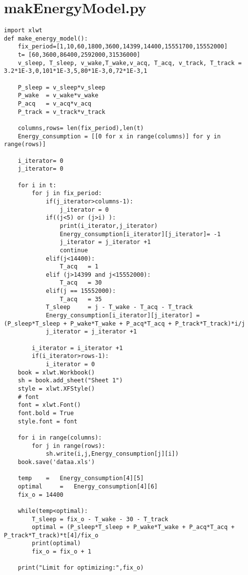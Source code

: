\begin{appendices}
\begin{lstlisting}
\end{lstlisting}
\label{Appendix:L76GNSS.py}
\chapter{makEnergyModel.py}
\begin{lstlisting}
import xlwt
def make_energy_model():
    fix_period=[1,10,60,1800,3600,14399,14400,15551700,15552000]
    t= [60,3600,86400,2592000,31536000]
    v_sleep, T_sleep, v_wake,T_wake,v_acq, T_acq, v_track, T_track = 3.2*1E-3,0,101*1E-3,5,80*1E-3,0,72*1E-3,1

    P_sleep = v_sleep*v_sleep
    P_wake  = v_wake*v_wake
    P_acq   = v_acq*v_acq
    P_track = v_track*v_track

    columns,rows= len(fix_period),len(t)
    Energy_consumption = [[0 for x in range(columns)] for y in range(rows)]

    i_iterator= 0
    j_iterator= 0

    for i in t:
        for j in fix_period:
            if(j_iterator>columns-1):
                j_iterator = 0   
            if((j<5) or (j>i) ):
                print(i_iterator,j_iterator)
                Energy_consumption[i_iterator][j_iterator]= -1
                j_iterator = j_iterator +1
                continue
            elif(j<14400):
                T_acq   = 1
            elif (j>14399 and j<15552000):
                T_acq   = 30      
            elif(j == 15552000):
                T_acq   = 35
            T_sleep     = j - T_wake - T_acq - T_track 
            Energy_consumption[i_iterator][j_iterator] = (P_sleep*T_sleep + P_wake*T_wake + P_acq*T_acq + P_track*T_track)*i/j
            j_iterator = j_iterator +1

        i_iterator = i_iterator +1
        if(i_iterator>rows-1):
            i_iterator = 0  
    book = xlwt.Workbook()
    sh = book.add_sheet("Sheet 1")
    style = xlwt.XFStyle()
    # font
    font = xlwt.Font()
    font.bold = True
    style.font = font
    
    for i in range(columns):
        for j in range(rows):
            sh.write(i,j,Energy_consumption[j][i])
    book.save('dataa.xls')

    temp    =   Energy_consumption[4][5]
    optimal     =   Energy_consumption[4][6]
    fix_o = 14400

    while(temp<optimal):  
        T_sleep = fix_o - T_wake - 30 - T_track
        optimal = (P_sleep*T_sleep + P_wake*T_wake + P_acq*T_acq + P_track*T_track)*t[4]/fix_o
        print(optimal)
        fix_o = fix_o + 1

    print("Limit for optimizing:",fix_o)

\end{lstlisting}
\label{Appendix:make_energy_model.py}
\end{appendices}
